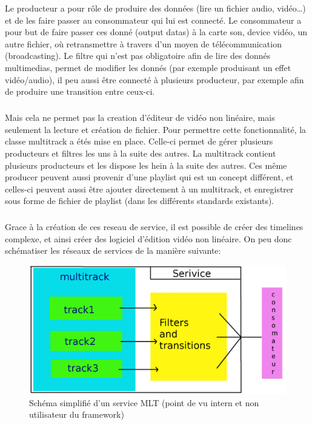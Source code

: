 Le producteur a pour rôle de produire des données (lire un fichier
audio, vidéo\ldots) et de les faire passer au consommateur qui lui est
connecté. Le consommateur a pour but de faire passer ces donné (output
datas) à la carte son, device vidéo, un autre fichier, où retransmettre
à travers d'un moyen de télécommunication (broadcasting).  Le filtre
qui n'est pas obligatoire afin de lire des donnés multimedias, permet
de modifier les donnés (par exemple produisant un effet vidéo/audio),
il peu aussi être connecté à plusieurs producteur, par exemple afin
de produire une transition entre ceux-ci.

\subparagraph{}

Mais cela ne permet pas la creation d'éditeur de vidéo non linéaire,
mais seulement la lecture et création de fichier. Pour permettre cette
fonctionnalité, la classe multitrack a étés mise en place. Celle-ci
permet de gérer plusieurs producteurs et filtres les uns à la suite des
autres. La multitrack contient plusieurs producteurs et les dispose les
hein à la suite des autres. Ces même producer peuvent aussi provenir
d'une playlist qui est un concept différent, et celles-ci peuvent aussi
être ajouter directement à un multitrack, et enregistrer sous forme
de fichier de playlist (dans les différents standards existants).

\subparagraph{}

Grace à la création de ces reseau de service, il est possible de créer
des timelines complexe, et ainsi créer des logiciel d'édition vidéo
non linéaire. On peu donc schématiser les réseaux de services de la
manière suivante:

\begin{figure} [H]

  \begin{center}

    \includegraphics[width=1.0\textwidth]{images/service}

  \end{center}

  \caption{Schéma simplifié d'un service MLT (point de vu intern et
    non utilisateur du framework)}

  \label{Yes}

\end{figure}

